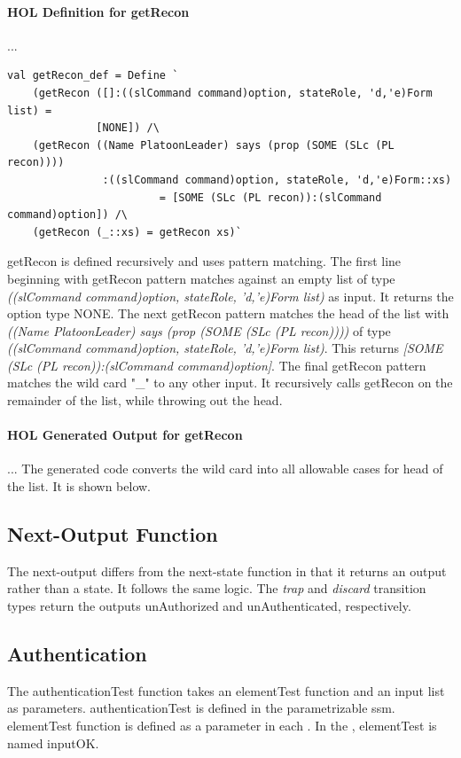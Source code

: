 \documentclass[../../main/main.tex]{subfiles}
\begin{document}
\paragraph*{HOL Definition for getRecon}...

\begin{lstlisting}
val getRecon_def = Define `
    (getRecon ([]:((slCommand command)option, stateRole, 'd,'e)Form list) =
    	      [NONE]) /\
    (getRecon ((Name PlatoonLeader) says (prop (SOME (SLc (PL recon))))
               :((slCommand command)option, stateRole, 'd,'e)Form::xs)
    	      	        = [SOME (SLc (PL recon)):(slCommand command)option]) /\
    (getRecon (_::xs) = getRecon xs)`
\end{lstlisting}

getRecon is defined recursively and uses pattern matching.  The first line beginning with getRecon pattern matches against an empty list of type \textit{((slCommand command)option, stateRole, 'd,'e)Form list)} as input.  It returns the option type NONE.  The next getRecon pattern matches the head of the list with \textit{((Name PlatoonLeader) says (prop (SOME (SLc (PL recon))))} of type  \textit{((slCommand command)option, stateRole, 'd,'e)Form list)}.  This returns \textit{[SOME (SLc (PL recon)):(slCommand command)option]}.  The final getRecon pattern matches the wild card "_" to any other input.  It recursively calls getRecon on the remainder of the list, while throwing out the head.

\paragraph*{HOL Generated Output for getRecon}...
The  generated code converts the wild card into all allowable cases for head of the list.  It is shown below.

\HOLThmTag{PlanPBDef}{getRecon_def}\HOLPlanPBDefTheoremsgetReconXXdef

\subsection{Next-Output Function}
The next-output differs from the next-state function in that it returns an output rather than a state.  It follows the same logic.  The \textit{trap} and \textit{discard} transition types return the outputs unAuthorized and unAuthenticated, respectively.
\HOLssmPlanPBTheoremsplanPBOutXXdef


\subsection{Authentication}
The authenticationTest function takes an elementTest function and an input list as parameters.  authenticationTest is defined in the parametrizable ssm.  elementTest function is defined as a parameter in each .  In the , elementTest is named inputOK.  
\end{document}
